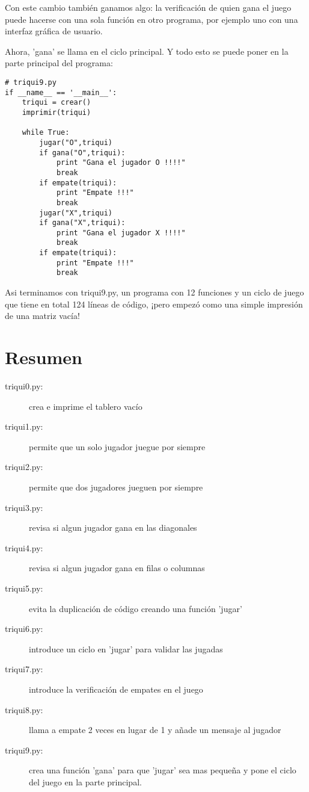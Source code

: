Con este cambio también ganamos algo: la verificación de quien gana el juego
puede hacerse con una sola función en otro programa, por ejemplo uno con 
una interfaz gráfica de usuario.

Ahora, 'gana' se llama en el ciclo principal. Y todo esto se puede poner en 
la parte principal del programa:

\begin{verbatim}
# triqui9.py
if __name__ == '__main__':
    triqui = crear()
    imprimir(triqui)

    while True:
        jugar("O",triqui)
        if gana("O",triqui):
            print "Gana el jugador O !!!!"
            break
        if empate(triqui):
            print "Empate !!!"
            break
        jugar("X",triqui)
        if gana("X",triqui):
            print "Gana el jugador X !!!!"
            break
        if empate(triqui):
            print "Empate !!!"
            break
\end{verbatim}
\afterverb

Asi terminamos con triqui9.py, un programa con 12 funciones y un ciclo de juego que
tiene en total 124 líneas de código, ¡pero empezó como una simple impresión de una 
matriz vacía!

\section{Resumen}

\begin{description}
\item[triqui0.py:] crea e imprime el tablero vacío
\item[triqui1.py:] permite que un solo jugador juegue por siempre
\item[triqui2.py:] permite que dos jugadores jueguen por siempre
\item[triqui3.py:] revisa si algun jugador gana en las diagonales
\item[triqui4.py:] revisa si algun jugador gana en filas o columnas
\item[triqui5.py:] evita la duplicación de código creando una función 'jugar'
\item[triqui6.py:] introduce un ciclo en 'jugar' para validar las jugadas 
\item[triqui7.py:] introduce la verificación de empates en el juego
\item[triqui8.py:] llama a empate 2 veces en lugar de 1 y añade un mensaje al jugador
\item[triqui9.py:] crea una función 'gana' para que 'jugar' sea mas pequeña y pone el ciclo 
            del juego en la parte principal.
\end{description}

